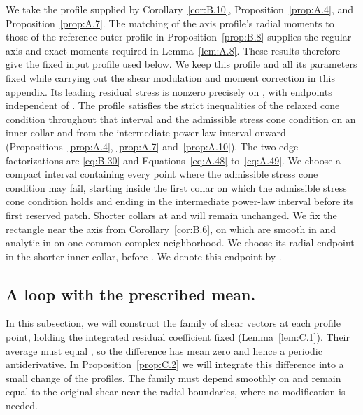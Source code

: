 We take the profile supplied by Corollary~\ref{cor:B.10}, Proposition~\ref{prop:A.4}, and Proposition~\ref{prop:A.7}.
The matching of the axis profile's radial moments to those of the reference outer profile in
Proposition~\ref{prop:B.8} supplies the regular axis and exact moments required in Lemma~\ref{lem:A.8}. These
results therefore give the fixed input profile  used below. We keep this profile and
all its parameters fixed while carrying out the shear modulation and moment correction in
this appendix. Its leading residual stress  is nonzero precisely on
, with endpoints
independent of . The profile satisfies the strict inequalities of the relaxed cone condition
throughout that interval and the admissible stress cone condition on an inner collar and
from the intermediate power-law interval onward (Propositions~\ref{prop:A.4}, \ref{prop:A.7} and~\ref{prop:A.10}). The two
edge factorizations are \eqref{eq:B.30} and Equations~\eqref{eq:A.48} to~\eqref{eq:A.49}. We choose a compact interval
 containing every point where the admissible stress cone condition
may fail, starting inside the first collar on which the admissible stress cone condition holds
and ending in the intermediate power-law interval before its first reserved patch. Shorter
collars at  and  will remain unchanged. We fix the rectangle near the axis from
Corollary~\ref{cor:B.6}, on which  are smooth in
 and analytic in  on one
common complex neighborhood. We choose its radial endpoint in the shorter inner collar,
before . We denote this endpoint by .

\subsection{A loop with the prescribed mean.}\label{sec:C.1}
In this subsection, we will construct the family
 of shear vectors at each profile point, holding the integrated residual coefficient
fixed (Lemma~\ref{lem:C.1}). Their average must equal , so the difference has mean zero and
hence a periodic antiderivative. In Proposition~\ref{prop:C.2} we will integrate this difference into a
small change of the profiles. The family must depend smoothly on  and remain equal
to the original shear near the radial boundaries, where no modification is needed.

